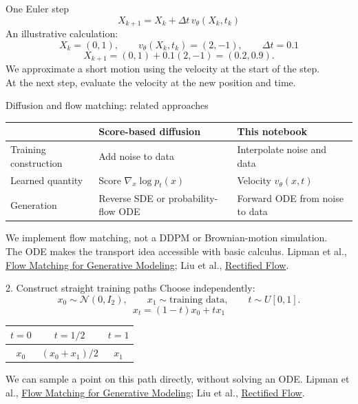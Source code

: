 \documentclass[aspectratio=169,11pt]{beamer}
\newcommand{\fmref}{\vfill{\tiny\color{gray}Lipman et al., \href{https://arxiv.org/abs/2210.02747}{Flow Matching for Generative Modeling}; Liu et al., \href{https://arxiv.org/abs/2209.03003}{Rectified Flow}.}}
\begin{document}
\begin{frame}{One Euler step}
\large
\[X_{k+1}=X_k+\Delta t\,v_\theta(X_k,t_k)\]
\normalsize
\vspace{3mm}
An illustrative calculation:
\[X_k=(0,1),\qquad v_\theta(X_k,t_k)=(2,-1),\qquad\Delta t=0.1\]
\[X_{k+1}=(0,1)+0.1(2,-1)=(0.2,0.9).\]
\vspace{4mm}
We approximate a short motion using the velocity at the start of the step.\\[3mm]
At the next step, evaluate the velocity at the new position and time.
\end{frame}



\begin{frame}{Diffusion and flow matching: related approaches}
\begin{center}
\small
\begin{tabular}{p{}p{}p{}}
\toprule
& Score-based diffusion & This notebook\\\midrule
Training construction & Add noise to data & Interpolate noise and data\\[3mm]
Learned quantity & Score $\nabla_x\log p_t(x)$ & Velocity $v_\theta(x,t)$\\[3mm]
Generation & Reverse SDE or probability-flow ODE & Forward ODE from noise to data\\\bottomrule
\end{tabular}
\end{center}
\vspace{4mm}
We implement \alert{flow matching}, not a DDPM or Brownian-motion simulation.\\[3mm]
The ODE makes the transport idea accessible with basic calculus.
\fmref
\end{frame}

\begin{frame}{2. Construct straight training paths}
Choose independently:
\[x_0\sim\mathcal N(0,I_2),\qquad x_1\sim\text{training data},\qquad t\sim U[0,1].\]
\large
\[\boxed{x_t=(1-t)x_0+tx_1}\]
\normalsize
\begin{center}
\begin{tabular}{ccc}
\toprule
$t=0$ & $t=1/2$ & $t=1$\\\midrule
$x_0$ & $(x_0+x_1)/2$ & $x_1$\\\bottomrule
\end{tabular}
\end{center}
\vspace{5mm}
We can sample a point on this path directly, without solving an ODE.
\fmref
\end{frame}
\end{document}
